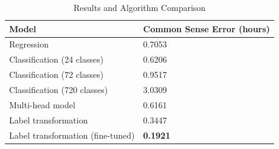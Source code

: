 \documentclass{article}
\begin{document}
    \begin{table}[!ht]
	\caption{Results and Algorithm Comparison}
	\label{tab:performance}
	\centering
	\begin{tabular}{ll}
		\toprule
		\textbf{Model} & \textbf{Common Sense Error (hours)} \\
		\midrule
		Regression & 0.7053 \\
		Classification (24 classes) & 0.6206 \\
		Classification (72 classes) & 0.9517 \\
		Classification (720 classes) & 3.0309 \\
		Multi-head model& 0.6161 \\
		Label transformation & 0.3447 \\
        Label transformation (fine-tuned) & \textbf{0.1921} \\
		\bottomrule
	\end{tabular}
\end{table}
\end{document}

